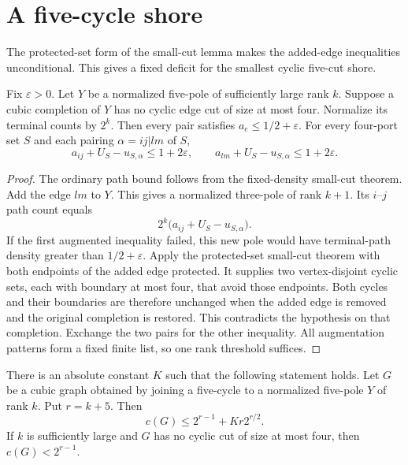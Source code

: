 \section{A five-cycle shore}
\label{sec:five-cycle-shore}

The protected-set form of the small-cut lemma makes the added-edge inequalities unconditional.
This gives a fixed deficit for the smallest cyclic five-cut shore.

\begin{lemma}
\label{lem:five-pole-unconditional-augmentation}
Fix $\varepsilon>0$.
Let $Y$ be a normalized five-pole of sufficiently large rank $k$.
Suppose a cubic completion of $Y$ has no cyclic edge cut of size at most four.
Normalize its terminal counts by $2^k$.
Then every pair satisfies $a_e\le1/2+\varepsilon$.
For every four-port set $S$ and each pairing $\alpha=ij|lm$ of $S$,
\[
 a_{ij}+U_S-u_{S,\alpha}\le1+2\varepsilon,
 \qquad
 a_{lm}+U_S-u_{S,\alpha}\le1+2\varepsilon.
\]
\end{lemma}

\begin{proof}
The ordinary path bound follows from the fixed-density small-cut theorem.
Add the edge $lm$ to $Y$.
This gives a normalized three-pole of rank $k+1$.
Its $i$--$j$ path count equals
\[
 2^k\bigl(a_{ij}+U_S-u_{S,\alpha}\bigr).
\]
If the first augmented inequality failed, this new pole would have terminal-path density greater than $1/2+\varepsilon$.
Apply the protected-set small-cut theorem with both endpoints of the added edge protected.
It supplies two vertex-disjoint cyclic sets, each with boundary at most four, that avoid those endpoints.
Both cycles and their boundaries are therefore unchanged when the added edge is removed and the original completion is restored.
This contradicts the hypothesis on that completion.
Exchange the two pairs for the other inequality.
All augmentation patterns form a fixed finite list, so one rank threshold suffices.
\end{proof}

\begin{theorem}
\label{thm:five-cycle-shore-sharp-order}
There is an absolute constant $K$ such that the following statement holds.
Let $G$ be a cubic graph obtained by joining a five-cycle to a normalized five-pole $Y$ of rank $k$.
Put $r=k+5$.
Then
\[
 c(G)\le2^{r-1}+Kr2^{r/2}.
\]
If $k$ is sufficiently large and $G$ has no cyclic cut of size at most four, then $c(G)<2^{r-1}$.
\end{theorem}

